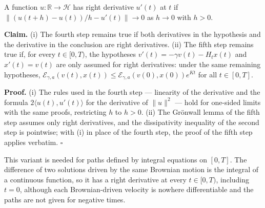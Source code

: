 \documentclass[11pt,a4paper]{article}
\begin{document}
A function \(u:\mathbb R\to\mathcal H\) has right derivative \(u'(t)\) at \(t\) if \(\|(u(t+h)-u(t))/h-u'(t)\|\to0\) as \(h\to0\) with \(h>0\).




\textbf{Claim.} (i) The fourth step remains true if both derivatives in the hypothesis and the derivative in the conclusion are right derivatives. (ii) The fifth step remains true if, for every \(t\in[0,T)\), the hypotheses \(v'(t)=-\gamma v(t)-H_tx(t)\) and \(x'(t)=v(t)\) are only assumed for right derivatives: under the same remaining hypotheses, \(\mathcal E_{\gamma,a}(v(t),x(t))\le\mathcal E_{\gamma,a}(v(0),x(0))e^{Kt}\) for all \(t\in[0,T]\).




\textbf{Proof.} (i) The rules used in the fourth step — linearity of the derivative and the formula \(2\langle u(t),u'(t)\rangle\) for the derivative of \(\|u\|^2\) — hold for one-sided limits with the same proofs, restricting \(h\) to \(h>0\). (ii) The Grönwall lemma of the fifth step assumes only right derivatives, and the dissipativity inequality of the second step is pointwise; with (i) in place of the fourth step, the proof of the fifth step applies verbatim. \(\square\)




This variant is needed for paths defined by integral equations on \([0,T]\). The difference of two solutions driven by the same Brownian motion is the integral of a continuous function, so it has a right derivative at every \(t\in[0,T)\), including \(t=0\), although each Brownian-driven velocity is nowhere differentiable and the paths are not given for negative times.
\end{document}
